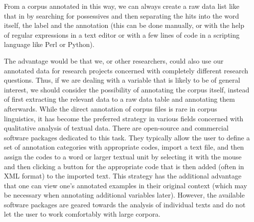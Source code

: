 From a corpus annotated in  this way, we can always create a raw data list like that in  by searching for possessives  and then separating the hits  into the word itself, the  label and the   annotation  (this can be done manually, or with the help of regular expressions in a text editor or with a few lines of code in a scripting language like Perl or Python).

The advantage would be that we, or other researchers, could also use our annotated  data for research projects concerned with completely different research questions. Thus, if we are dealing with a variable that is likely to be of general interest, we should consider the possibility of annotating the corpus itself, instead of first extracting  the relevant data to a raw data table and annotating them afterwards. While the direct annotation of corpus files is rare in corpus linguistics, it has become the preferred strategy in various fields concerned with qualitative  analysis of textual data. There are open\hyp{}source and commercial software packages dedicated to this task. They typically allow the user to define a set of annotation  categories  with appropriate codes,  import a text file, and then assign the codes to a word or larger textual unit by selecting it with the mouse and then clicking a button for the appropriate code that is then added (often in XML format) to the imported text. This strategy has the additional advantage that one can view one's annotated  examples in their original context (which may be necessary when annotating additional variables later). However, the available software packages are geared towards the analysis of individual texts and do not let the user to work comfortably with large  corpora.

